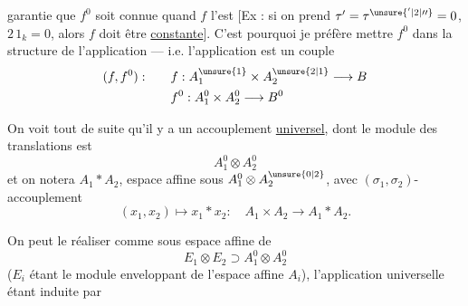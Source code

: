 garantie que $f^0$ soit connue quand $f$ l'est [Ex : si on prend $\tau^{\prime}=\tau^{\unsure{'|2|\prime\prime}}=0$, $2\,1_k=0$, alors $f$ doit être \uline{constante}]. C'est pourquoi je préfère mettre $f^0$ dans la structure de l'application --- i.e. l'application est un couple
\[
 \begin{aligned}
 (f,f^0):\qquad &f:A_1^{\unsure{1}}\times A_2^{\unsure{2|1}}\longrightarrow B\\
 &f^0:A_1^0\times A_2^0\longrightarrow B^0
 \end{aligned}
\]

On voit tout de suite qu'il y a un accouplement \uline{universel}, dont le module des translations est
\[
 A_1^0\otimes A_2^0
\]
et  on notera $A_1\ast A_2$, espace affine sous $A_1^0\otimes A_2^{\unsure{0|2}}$, avec $(\sigma_1,\sigma_2)$-accouplement
\[
 (x_1,x_2)\longmapsto x_1\ast x_2:\quad A_1\times A_2\longrightarrow A_1\ast A_2.
\]

On peut le réaliser comme sous espace affine de
\[
 E_1\otimes E_2\supset A_1^0\otimes A_2^0
\]
($E_i$ étant le module enveloppant de l'espace affine $A_i$), l'application universelle étant induite par

